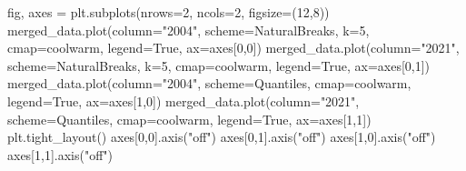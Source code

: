 \documentclass[
  letterpaper,
  DIV=11,
  numbers=noendperiod]{scrreprt}
\newenvironment{Shaded}{\begin{snugshade}}{\end{snugshade}}
\newcommand{\DecValTok}[1]{\textcolor[rgb]{0.68,0.00,0.00}{#1}}
\newcommand{\NormalTok}[1]{\textcolor[rgb]{0.00,0.23,0.31}{#1}}
\newcommand{\OperatorTok}[1]{\textcolor[rgb]{0.37,0.37,0.37}{#1}}
\newcommand{\StringTok}[1]{\textcolor[rgb]{0.13,0.47,0.30}{#1}}
\newcommand{\VariableTok}[1]{\textcolor[rgb]{0.07,0.07,0.07}{#1}}
\begin{document}
\begin{Shaded}
\begin{Highlighting}[]
\NormalTok{fig, axes }\OperatorTok{=}\NormalTok{ plt.subplots(nrows}\OperatorTok{=}\DecValTok{2}\NormalTok{, ncols}\OperatorTok{=}\DecValTok{2}\NormalTok{, figsize}\OperatorTok{=}\NormalTok{(}\DecValTok{12}\NormalTok{,}\DecValTok{8}\NormalTok{))}
\NormalTok{merged\_data.plot(column}\OperatorTok{=}\StringTok{"2004"}\NormalTok{, scheme}\OperatorTok{=}\StringTok{\textquotesingle{}NaturalBreaks\textquotesingle{}}\NormalTok{, k}\OperatorTok{=}\DecValTok{5}\NormalTok{, cmap}\OperatorTok{=}\StringTok{\textquotesingle{}coolwarm\textquotesingle{}}\NormalTok{, legend}\OperatorTok{=}\VariableTok{True}\NormalTok{, ax}\OperatorTok{=}\NormalTok{axes[}\DecValTok{0}\NormalTok{,}\DecValTok{0}\NormalTok{])}
\NormalTok{merged\_data.plot(column}\OperatorTok{=}\StringTok{"2021"}\NormalTok{, scheme}\OperatorTok{=}\StringTok{\textquotesingle{}NaturalBreaks\textquotesingle{}}\NormalTok{, k}\OperatorTok{=}\DecValTok{5}\NormalTok{, cmap}\OperatorTok{=}\StringTok{\textquotesingle{}coolwarm\textquotesingle{}}\NormalTok{, legend}\OperatorTok{=}\VariableTok{True}\NormalTok{, ax}\OperatorTok{=}\NormalTok{axes[}\DecValTok{0}\NormalTok{,}\DecValTok{1}\NormalTok{])}
\NormalTok{merged\_data.plot(column}\OperatorTok{=}\StringTok{"2004"}\NormalTok{, scheme}\OperatorTok{=}\StringTok{\textquotesingle{}Quantiles\textquotesingle{}}\NormalTok{,  cmap}\OperatorTok{=}\StringTok{\textquotesingle{}coolwarm\textquotesingle{}}\NormalTok{, legend}\OperatorTok{=}\VariableTok{True}\NormalTok{, ax}\OperatorTok{=}\NormalTok{axes[}\DecValTok{1}\NormalTok{,}\DecValTok{0}\NormalTok{])}
\NormalTok{merged\_data.plot(column}\OperatorTok{=}\StringTok{"2021"}\NormalTok{, scheme}\OperatorTok{=}\StringTok{\textquotesingle{}Quantiles\textquotesingle{}}\NormalTok{,  cmap}\OperatorTok{=}\StringTok{\textquotesingle{}coolwarm\textquotesingle{}}\NormalTok{, legend}\OperatorTok{=}\VariableTok{True}\NormalTok{, ax}\OperatorTok{=}\NormalTok{axes[}\DecValTok{1}\NormalTok{,}\DecValTok{1}\NormalTok{])}
\NormalTok{plt.tight\_layout()}
\NormalTok{axes[}\DecValTok{0}\NormalTok{,}\DecValTok{0}\NormalTok{].axis(}\StringTok{"off"}\NormalTok{)}
\NormalTok{axes[}\DecValTok{0}\NormalTok{,}\DecValTok{1}\NormalTok{].axis(}\StringTok{"off"}\NormalTok{)}
\NormalTok{axes[}\DecValTok{1}\NormalTok{,}\DecValTok{0}\NormalTok{].axis(}\StringTok{"off"}\NormalTok{)}
\NormalTok{axes[}\DecValTok{1}\NormalTok{,}\DecValTok{1}\NormalTok{].axis(}\StringTok{"off"}\NormalTok{)}


\end{Highlighting}
\end{Shaded}
\end{document}
